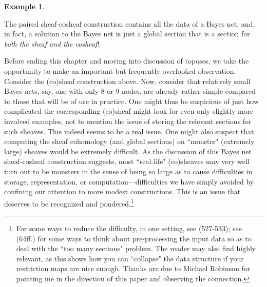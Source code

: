 \documentclass[11pt]{book}
\theoremstyle{definition}
\newtheorem{example}{Example}[section]
\theoremstyle{definition}
\theoremstyle{definition}
\theoremstyle{theorem}
\theoremstyle{definition}
\begin{document}
\begin{example}
\begin{center}
	\end{center} 
 The paired sheaf-cosheaf construction contains all the data of a Bayes net; and, in fact, a solution to the Bayes net is just a global section that is a section for \textit{both the sheaf and the cosheaf}! \par  
 Before ending this chapter and moving into discussion of toposes, we take the opportunity to make an important but frequently overlooked observation. Consider the (co)sheaf construction above. Now, consider that relatively small Bayes nets, say, one with only 8 or 9 nodes, are already rather simple compared to those that will be of use in practice. One might thus be suspicious of just how complicated the corresponding (co)sheaf might look for even only slightly more involved examples, not to mention the issue of storing the relevant sections for such sheaves. This indeed seems to be a real issue. One might also suspect that computing the sheaf cohomology (and global sections) on ``monster" (extremely large) sheaves would be extremely difficult. As the discussion of this Bayes net sheaf-cosheaf construction suggests, most ``real-life" (co)sheaves may very well turn out to be monsters in the sense of being so large as to cause difficulties in storage, representation, or computation---difficulties we have simply avoided by confining our attention to more modest constructions. This is an issue that deserves to be recognized and pondered.\footnote{For some ways to reduce the difficulty, in one setting, see \cite{smith_introduction_2014} (527-533); see \cite{curry_sheaves_2013} (64ff.) for some ways to think about pre-processing the input data so as to deal with the ``too many sections" problem. The reader may also find \cite{curry_discrete_2015} highly relevant, as this shows how you can ``collapse" the data structure if your restriction maps are nice enough. Thanks are due to Michael Robinson for pointing me in the direction of this paper and observing the connection.}       
\end{example}
\printbibliography 
\printindex
\end{document}
